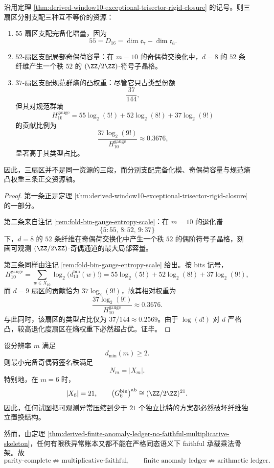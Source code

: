 \begin{theorem}\label{thm:derived-window10-trisector-resource-orthogonality}
沿用定理 \ref{thm:derived-window10-exceptional-trisector-rigid-closure} 的记号。则三扇区分别支配三种互不等价的资源：
\begin{enumerate}
\normalfont
  \item \(55\)-扇区支配完备化增量，因为
  \[
  55=D_{16}=\dim\mathfrak e_7-\dim\mathfrak e_6.
  \]
  \item \(52\)-扇区支配局部奇偶荷容量：在 \(m=10\) 的奇偶荷交换化中，\(d=8\) 的 \(52\) 条纤维产生一个秩 \(52\) 的 \((\ZZ/2\ZZ)\)-符号子晶格。
  \item \(37\)-扇区支配规范群熵的凸权重：尽管它只占类型份额
  \[
  \frac{37}{144},
  \]
  但其对规范群熵
  \[
  H_{10}^{\mathrm{gauge}}
  =
  55\log_2(5!)+52\log_2(8!)+37\log_2(9!)
  \]
  的贡献比例为
  \[
  \frac{37\log_2(9!)}{H_{10}^{\mathrm{gauge}}}\approx 0.3676,
  \]
  显著高于其类型占比。
\end{enumerate}
因此，三扇区并不是同一资源的三段，而分别支配完备化模、奇偶荷容量与规范熵凸权重三条正交资源轴。
\end{theorem}

\begin{proof}
第一条正是定理 \ref{thm:derived-window10-exceptional-trisector-rigid-closure} 的一部分。

第二条来自注记 \ref{rem:fold-bin-gauge-entropy-scale}：在 \(m=10\) 的退化谱
\[
\{5:55,\,8:52,\,9:37\}
\]
下，\(d=8\) 的 \(52\) 条纤维在奇偶荷交换化中产生一个秩 \(52\) 的偶阶符号子晶格，刻画可观测 \((\ZZ/2\ZZ)\)-奇偶通道的最大局部容量。

第三条同样由注记 \ref{rem:fold-bin-gauge-entropy-scale} 给出。按 bits 记号，
\[
H_{10}^{\mathrm{gauge}}
=
\sum_{w\in X_{10}}\log_2\bigl(d_{10}^{\mathrm{bin}}(w)!\bigr)
=
55\log_2(5!)+52\log_2(8!)+37\log_2(9!),
\]
而 \(d=9\) 扇区的贡献恰为 \(37\log_2(9!)\)，故其相对权重为
\[
\frac{37\log_2(9!)}{H_{10}^{\mathrm{gauge}}}\approx 0.3676.
\]
与此同时，该扇区的类型占比仅为 \(37/144\approx 0.2569\)。由于 \(\log(d!)\) 对 \(d\) 严格凸，较高退化度扇区在熵权重下必然超占优。证毕。
\end{proof}

\begin{corollary}\label{cor:derived-parity-complete-not-multiplicative-faithful}
设分辨率 \(m\) 满足
\[
d_{\min}(m)\ge 2.
\]
则最小完备奇偶荷签名秩满足
\[
N_m=|X_m|.
\]
特别地，在 \(m=6\) 时，
\[
|X_6|=21,
\qquad
\bigl(G_6^{\mathrm{bin}}\bigr)^{\mathrm{ab}}\cong (\ZZ/2\ZZ)^{21}.
\]
因此，任何试图把可观测异常压缩到少于 \(21\) 个独立比特的方案都必然破坏纤维独立置换结构。

然而，由定理 \ref{thm:derived-finite-anomaly-ledger-no-faithful-multiplicative-skeleton}，任何有限秩异常账本又都不能在严格同态语义下 faithful 承载乘法骨架。故
\[
\text{parity-complete}\not\Rightarrow \text{multiplicative-faithful},
\qquad
\text{finite anomaly ledger}\not\Rightarrow \text{arithmetic ledger}.
\]
\end{corollary}

